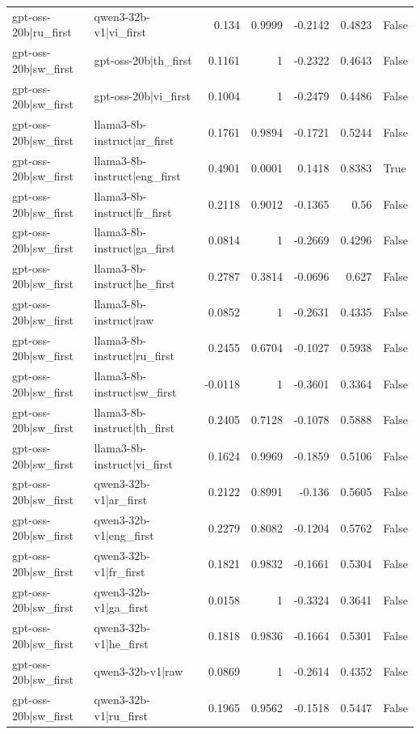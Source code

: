 \begin{table}
\begin{tabular}{l l r r r r l}
gpt-oss-20b|ru_first & qwen3-32b-v1|vi_first & 0.134 & 0.9999 & -0.2142 & 0.4823 & False \\
gpt-oss-20b|sw_first & gpt-oss-20b|th_first & 0.1161 & 1 & -0.2322 & 0.4643 & False \\
gpt-oss-20b|sw_first & gpt-oss-20b|vi_first & 0.1004 & 1 & -0.2479 & 0.4486 & False \\
gpt-oss-20b|sw_first & llama3-8b-instruct|ar_first & 0.1761 & 0.9894 & -0.1721 & 0.5244 & False \\
gpt-oss-20b|sw_first & llama3-8b-instruct|eng_first & 0.4901 & 0.0001 & 0.1418 & 0.8383 & True \\
gpt-oss-20b|sw_first & llama3-8b-instruct|fr_first & 0.2118 & 0.9012 & -0.1365 & 0.56 & False \\
gpt-oss-20b|sw_first & llama3-8b-instruct|ga_first & 0.0814 & 1 & -0.2669 & 0.4296 & False \\
gpt-oss-20b|sw_first & llama3-8b-instruct|he_first & 0.2787 & 0.3814 & -0.0696 & 0.627 & False \\
gpt-oss-20b|sw_first & llama3-8b-instruct|raw & 0.0852 & 1 & -0.2631 & 0.4335 & False \\
gpt-oss-20b|sw_first & llama3-8b-instruct|ru_first & 0.2455 & 0.6704 & -0.1027 & 0.5938 & False \\
gpt-oss-20b|sw_first & llama3-8b-instruct|sw_first & -0.0118 & 1 & -0.3601 & 0.3364 & False \\
gpt-oss-20b|sw_first & llama3-8b-instruct|th_first & 0.2405 & 0.7128 & -0.1078 & 0.5888 & False \\
gpt-oss-20b|sw_first & llama3-8b-instruct|vi_first & 0.1624 & 0.9969 & -0.1859 & 0.5106 & False \\
gpt-oss-20b|sw_first & qwen3-32b-v1|ar_first & 0.2122 & 0.8991 & -0.136 & 0.5605 & False \\
gpt-oss-20b|sw_first & qwen3-32b-v1|eng_first & 0.2279 & 0.8082 & -0.1204 & 0.5762 & False \\
gpt-oss-20b|sw_first & qwen3-32b-v1|fr_first & 0.1821 & 0.9832 & -0.1661 & 0.5304 & False \\
gpt-oss-20b|sw_first & qwen3-32b-v1|ga_first & 0.0158 & 1 & -0.3324 & 0.3641 & False \\
gpt-oss-20b|sw_first & qwen3-32b-v1|he_first & 0.1818 & 0.9836 & -0.1664 & 0.5301 & False \\
gpt-oss-20b|sw_first & qwen3-32b-v1|raw & 0.0869 & 1 & -0.2614 & 0.4352 & False \\
gpt-oss-20b|sw_first & qwen3-32b-v1|ru_first & 0.1965 & 0.9562 & -0.1518 & 0.5447 & False \\

\end{tabular}
\end{table}
